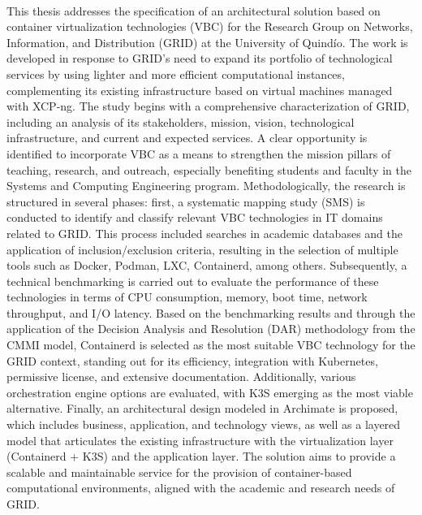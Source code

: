 \label{cap:abstract}
\mbox{}\\
This thesis addresses the specification of an architectural solution based on container virtualization technologies (VBC) for the Research Group on Networks, Information, and Distribution (GRID) at the University of Quindío. The work is developed in response to GRID's need to expand its portfolio of technological services by using lighter and more efficient computational instances, complementing its existing infrastructure based on virtual machines managed with XCP-ng. The study begins with a comprehensive characterization of GRID, including an analysis of its stakeholders, mission, vision, technological infrastructure, and current and expected services. A clear opportunity is identified to incorporate VBC as a means to strengthen the mission pillars of teaching, research, and outreach, especially benefiting students and faculty in the Systems and Computing Engineering program. Methodologically, the research is structured in several phases: first, a systematic mapping study (SMS) is conducted to identify and classify relevant VBC technologies in IT domains related to GRID. This process included searches in academic databases and the application of inclusion/exclusion criteria, resulting in the selection of multiple tools such as Docker, Podman, LXC, Containerd, among others. Subsequently, a technical benchmarking is carried out to evaluate the performance of these technologies in terms of CPU consumption, memory, boot time, network throughput, and I/O latency. Based on the benchmarking results and through the application of the Decision Analysis and Resolution (DAR) methodology from the CMMI model, Containerd is selected as the most suitable VBC technology for the GRID context, standing out for its efficiency, integration with Kubernetes, permissive license, and extensive documentation. Additionally, various orchestration engine options are evaluated, with K3S emerging as the most viable alternative. Finally, an architectural design modeled in Archimate is proposed, which includes business, application, and technology views, as well as a layered model that articulates the existing infrastructure with the virtualization layer (Containerd + K3S) and the application layer. The solution aims to provide a scalable and maintainable service for the provision of container-based computational environments, aligned with the academic and research needs of GRID.